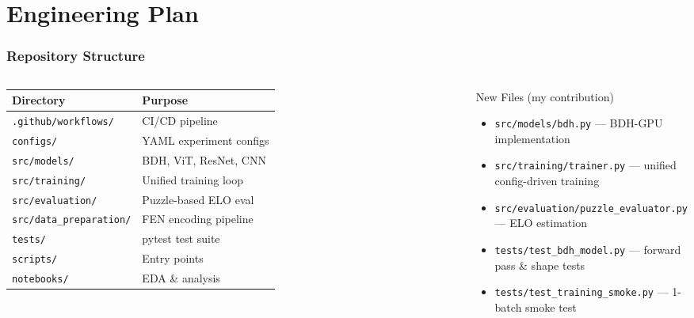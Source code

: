 \documentclass{beamer}
\begin{document}
\section{Engineering Plan}

\begin{frame}
\frametitle{Repository Structure}

\begin{columns}
\begin{table}
\centering
\footnotesize
\begin{tabular}{ll}
\toprule
\textbf{Directory} & \textbf{Purpose} \\
\midrule
\texttt{.github/workflows/} & CI/CD pipeline \\
\texttt{configs/} & YAML experiment configs \\
\texttt{src/models/} & BDH, ViT, ResNet, CNN \\
\texttt{src/training/} & Unified training loop \\
\texttt{src/evaluation/} & Puzzle-based ELO eval \\
\texttt{src/data\_preparation/} & FEN encoding pipeline \\
\texttt{tests/} & pytest test suite \\
\texttt{scripts/} & Entry points \\
\texttt{notebooks/} & EDA \& analysis \\
\bottomrule
\end{tabular}
\end{table}

\begin{block}{New Files (my contribution)}
\footnotesize
\begin{itemize}
    \item \texttt{src/models/\alert{bdh.py}} --- BDH-GPU implementation
    \item \texttt{src/training/\alert{trainer.py}} --- unified config-driven training
    \item \texttt{src/evaluation/\alert{puzzle\_evaluator.py}} --- ELO estimation
    \item \texttt{tests/\alert{test\_bdh\_model.py}} --- forward pass \& shape tests
    \item \texttt{tests/\alert{test\_training\_smoke.py}} --- 1-batch smoke test
\end{itemize}
\end{block}
\end{columns}

\end{frame}
\end{document}
